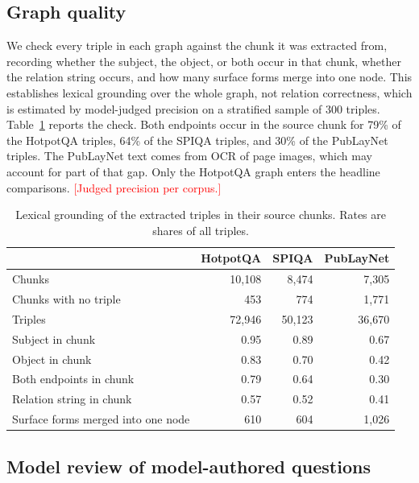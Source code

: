 \documentclass[preprint,12pt]{elsarticle}
\newcommand{\tbd}[1]{\textcolor{red}{[#1]}}
\begin{document}
\subsection{Graph quality}

We check every triple in each graph against the chunk it was extracted from,
recording whether the subject, the object, or both occur in that chunk,
whether the relation string occurs, and how many surface forms merge into one
node. This establishes lexical grounding over the whole graph, not relation
correctness, which is estimated by model-judged precision on a stratified
sample of 300 triples. Table~\ref{tab:grounding} reports the check. Both
endpoints occur in the source chunk for 79\% of the HotpotQA triples, 64\% of
the SPIQA triples, and 30\% of the PubLayNet triples. The PubLayNet text comes
from OCR of page images, which may account for part of that gap. Only the
HotpotQA graph enters the headline comparisons. \tbd{Judged precision per
corpus.}

\begin{table}[t]
\caption{Lexical grounding of the extracted triples in their source chunks.
Rates are shares of all triples.}
\label{tab:grounding}
\centering
\footnotesize
\begin{tabular}{@{}lrrr@{}}
\toprule
 & HotpotQA & SPIQA & PubLayNet \\
\midrule
Chunks                         & 10{,}108 & 8{,}474 & 7{,}305 \\
Chunks with no triple          & 453      & 774     & 1{,}771 \\
Triples                        & 72{,}946 & 50{,}123 & 36{,}670 \\
Subject in chunk               & 0.95 & 0.89 & 0.67 \\
Object in chunk                & 0.83 & 0.70 & 0.42 \\
Both endpoints in chunk        & 0.79 & 0.64 & 0.30 \\
Relation string in chunk       & 0.57 & 0.52 & 0.41 \\
Surface forms merged into one node & 610 & 604 & 1{,}026 \\
\bottomrule
\end{tabular}
\end{table}

\subsection{Model review of model-authored questions}
\end{document}
